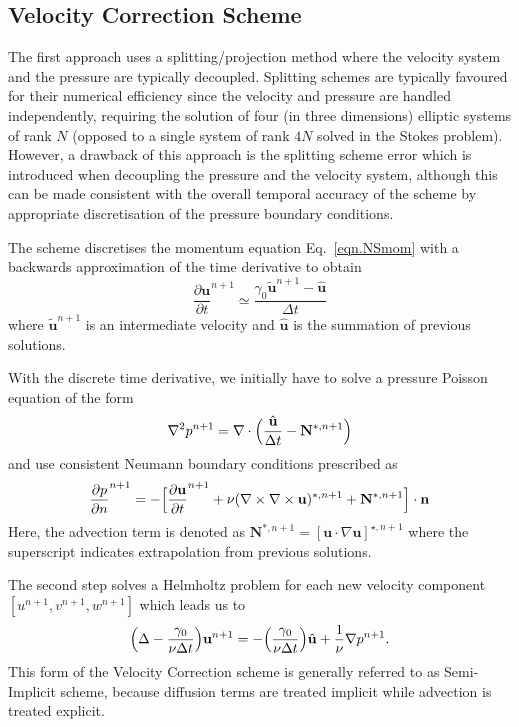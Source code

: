 \subsection{Velocity Correction Scheme}
\label{VCSScheme}
The first approach uses a splitting/projection method where the
velocity system and the pressure are typically
decoupled. Splitting schemes are typically favoured for their
numerical efficiency since the velocity and pressure are handled
independently, requiring the solution of four (in three dimensions)
elliptic systems of rank $N$ (opposed to a single system of rank $4N$
solved in the Stokes problem). However, a drawback of this approach is
the splitting scheme error which is introduced when decoupling the
pressure and the velocity system, although this can be made consistent
with the overall temporal accuracy of the scheme by appropriate
discretisation of the pressure boundary conditions.

The scheme discretises the momentum equation Eq.~\eqref{eqn.NSmom} with a backwards
approximation of the time derivative to obtain
\begin{equation}
  \frac{\partial \mathbf{u}}{\partial t}^{n+1} \simeq \frac{\gamma_0 \tilde{\mathbf{u}}^{n+1} - \hat{\mathbf{u}}}{\Delta t}
\end{equation}
where $\tilde{\mathbf{u}}^{n+1}$ is an intermediate velocity and $\hat{\mathbf{u}}$ 
is the summation of previous solutions.

With the discrete time derivative, we initially have to 
solve a pressure Poisson equation of the form
\begin{equation}
  \nabla^2 p^{n+1}=\nabla\cdot \Bigl(
  \frac{\hat{\mathbf{u}}}{\Delta t}  - \mathbf{N}^{*,n+1} \Bigr)
  \label{eqn.pressurepoisson}
\end{equation}
and use consistent Neumann boundary conditions prescribed as
\begin{equation}
  \frac{\partial p}{\partial n}^{n+1}= - \Bigl[ \frac{\partial \mathbf{u}}{\partial t}^{n+1} + \nu (\nabla \times \nabla \times   \mathbf{u})^{*,n+1} + \mathbf{N}^{*,n+1}\Bigr]\cdot \mathbf{n}
  \label{eqn.pressurebcs}
\end{equation}
Here, the advection term is denoted as 
$\mathbf{N}^{*,n+1} = [\mathbf{u} \cdot \nabla \mathbf{u}]^{\star,n+1}$ 
where the superscript indicates extrapolation from previous solutions.

The second step solves a Helmholtz problem for each 
new velocity component $[u^{n+1}, v^{n+1}, w^{n+1}]$
which leads us to
\begin{equation}
  \Bigl(\Delta-\frac{\gamma_0}{\nu \Delta t}\Bigr)\mathbf{u}^{n+1}=-\Bigl(\frac{\gamma_0}{\nu \Delta t}\Bigr)\hat{\mathbf{u}} + \frac{1}{\nu} \nabla p^{n+1}.
  \label{eqn.velocityhelm}
\end{equation}
This form of the Velocity Correction scheme is generally referred to as 
Semi-Implicit scheme, because diffusion terms are treated 
implicit while advection is treated explicit.

